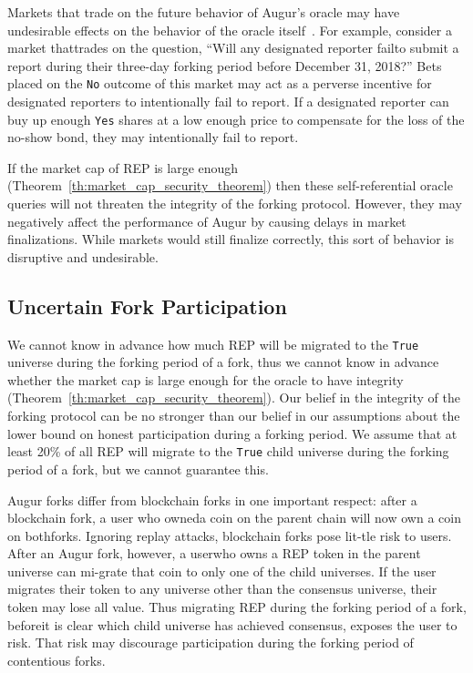 \documentclass[12pt,floatfix,reprint,nofootinbib,amsmath,amssymb,epsfig,pre,floats,letterpaper,groupedaffiliation]{revtex4-1}
\theoremstyle{definition}
\theoremstyle{definition}
\begin{document}
Markets that trade on the future behavior of Augur's oracle may have undesirable effects on the behavior of the oracle itself~\cite{Othman_2010}. For example, consider a market that\linebreak trades on the question, ``Will any designated reporter fail\linebreak to submit a report during their three-day forking period before December 31, 2018?'' Bets placed on the \texttt{No} outcome of this market may act as a perverse incentive for designated reporters to intentionally fail to report. If a designated reporter can buy up enough \texttt{Yes} shares at a low enough price to compensate for the loss of the no-\linebreak show bond, they may intentionally fail to report.

If the market cap of REP is large enough (Theorem~\ref{th:market_cap_security_theorem}) then these self-referential oracle queries will not threaten the integrity of the forking protocol. However, they may negatively affect the performance of Augur by causing delays in market finalizations. While markets would still finalize correctly, this sort of behavior is disruptive and undesirable.

\subsection{Uncertain Fork Participation}

We cannot know in advance how much REP will be migrated to the \texttt{True} universe during the forking period of a fork, thus we cannot know in advance whether the market cap is large enough for the oracle to have integrity (Theorem~\ref{th:market_cap_security_theorem}). Our belief in the integrity of the forking protocol can be no stronger than our belief in our assumptions about the lower bound on honest participation during a forking period. We assume that at least 20\% of all REP will migrate to the \texttt{True} child universe during the forking period of a fork, but we cannot guarantee this.

Augur forks differ from blockchain forks in one impor\-tant respect: after a blockchain fork, a user who owned\linebreak a coin on the parent chain will now own a coin on both\linebreak forks. Ignoring replay attacks, blockchain forks pose lit-\linebreak tle risk to users. After an Augur fork, however, a user\linebreak who owns a REP token in the parent universe can mi-\linebreak grate that coin to only one of the child universes. If the user migrates their token to any universe other than the consensus universe, their token may lose all value. Thus migrating REP during the forking period of a fork, before\linebreak it is clear which child universe has achieved consensus, exposes the user to risk. That risk may discourage par\-ticipation during the forking period of contentious forks.
\end{document}
